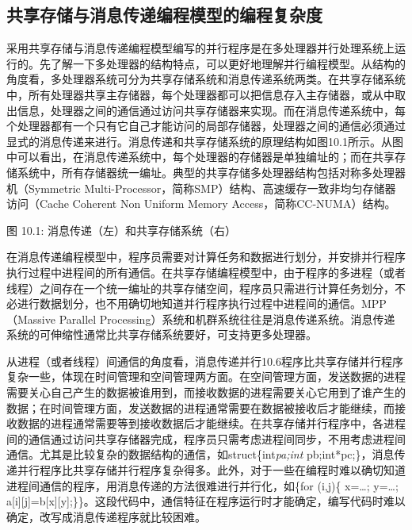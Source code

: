 \documentclass[]{ctexbook}
\begin{document}
\hypertarget{ux5171ux4eabux5b58ux50a8ux4e0eux6d88ux606fux4f20ux9012ux7f16ux7a0bux6a21ux578bux7684ux7f16ux7a0bux590dux6742ux5ea6}{%
\subsection{共享存储与消息传递编程模型的编程复杂度}\label{ux5171ux4eabux5b58ux50a8ux4e0eux6d88ux606fux4f20ux9012ux7f16ux7a0bux6a21ux578bux7684ux7f16ux7a0bux590dux6742ux5ea6}}

采用共享存储与消息传递编程模型编写的并行程序是在多处理器并行处理系统上运行的。先了解一下多处理器的结构特点，可以更好地理解并行编程模型。从结构的角度看，多处理器系统可分为共享存储系统和消息传递系统两类。在共享存储系统中，所有处理器共享主存储器，每个处理器都可以把信息存入主存储器，或从中取出信息，处理器之间的通信通过访问共享存储器来实现。而在消息传递系统中，每个处理器都有一个只有它自己才能访问的局部存储器，处理器之间的通信必须通过显式的消息传递来进行。消息传递和共享存储系统的原理结构如图10.1所示。从图中可以看出，在消息传递系统中，每个处理器的存储器是单独编址的；而在共享存储系统中，所有存储器统一编址。典型的共享存储多处理器结构包括对称多处理器机（Symmetric Multi-Processor，简称SMP）结构、高速缓存一致非均匀存储器访问（Cache Coherent Non Uniform Memory Access，简称CC-NUMA）结构。

图 10.1: 消息传递（左）和共享存储系统（右）

在消息传递编程模型中，程序员需要对计算任务和数据进行划分，并安排并行程序执行过程中进程间的所有通信。在共享存储编程模型中，由于程序的多进程（或者线程）之间存在一个统一编址的共享存储空间，程序员只需进行计算任务划分，不必进行数据划分，也不用确切地知道并行程序执行过程中进程间的通信。MPP（Massive Parallel Processing）系统和机群系统往往是消息传递系统。消息传递系统的可伸缩性通常比共享存储系统要好，可支持更多处理器。

从进程（或者线程）间通信的角度看，消息传递并行10.6程序比共享存储并行程序复杂一些，体现在时间管理和空间管理两方面。在空间管理方面，发送数据的进程需要关心自己产生的数据被谁用到，而接收数据的进程需要关心它用到了谁产生的数据；在时间管理方面，发送数据的进程通常需要在数据被接收后才能继续，而接收数据的进程通常需要等到接收数据后才能继续。在共享存储并行程序中，各进程间的通信通过访问共享存储器完成，程序员只需考虑进程间同步，不用考虑进程间通信。尤其是比较复杂的数据结构的通信，如struct\{int\emph{pa;int} pb;int*pc;\}，消息传递并行程序比共享存储并行程序复杂得多。此外，对于一些在编程时难以确切知道进程间通信的程序，用消息传递的方法很难进行并行化，如\{for (i,j)\{ x=\ldots; y=\ldots; a{[}i{]}{[}j{]}=b{[}x{]}{[}y{]};\}\}。这段代码中，通信特征在程序运行时才能确定，编写代码时难以确定，改写成消息传递程序就比较困难。
\end{document}
